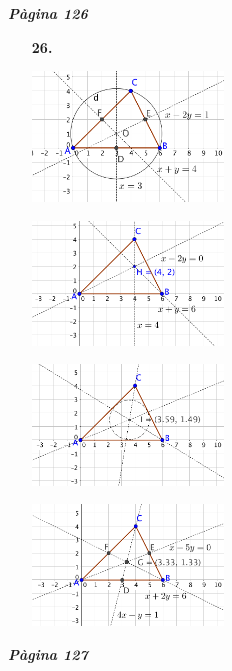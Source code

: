 \documentclass[a4paper, pdf, twoside]{book}
\begin{document}
\begin{multicols}{2}
{\textbf{\em Pàgina 126}} \hrulefill
\begin{enumerate}
\vspace{0.25cm}
\item[\fontfamily{phv}\selectfont\color{blue}\textbf{26. }] 
\mbox {}\par \includegraphics [width=0.4\textwidth ]{img-sol/t9-22a} \par \includegraphics [width=0.4\textwidth ]{img-sol/t9-22b} \par \includegraphics [width=0.4\textwidth ]{img-sol/t9-22c} \par \includegraphics [width=0.4\textwidth ]{img-sol/t9-22d}
 \end{enumerate}
\vspace{0.3cm}


{\textbf{\em Pàgina 127}} \hrulefill
\begin{enumerate}
\vspace{0.25cm}




\end{enumerate}
\end{multicols}
\end{document}

